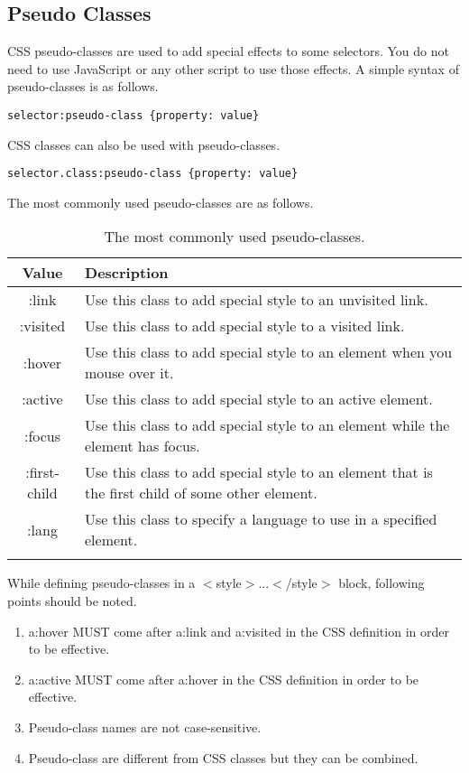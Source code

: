 \documentclass[a4paper,oneside]{book}
\numberwithin{equation}{chapter}
\begin{document}
\subsection{Pseudo Classes}
CSS pseudo-classes are used to add special effects to some selectors. You do not need to use JavaScript or any other script to use those effects. A simple syntax of pseudo-classes is as follows.
\begin{verbatim}
selector:pseudo-class {property: value}
\end{verbatim}
CSS classes can also be used with pseudo-classes.
\begin{verbatim}
selector.class:pseudo-class {property: value}
\end{verbatim}
The most commonly used pseudo-classes are as follows.
\begin{center}
\begin{longtable}{|c|p{10cm}|}
\hline
\textbf{Value} & \textbf{Description}\\
\hline
:link &	Use this class to add special style to an unvisited link.\\
\hline
:visited & Use this class to add special style to a visited link.\\
\hline
:hover & Use this class to add special style to an element when you mouse over it.\\
\hline
:active & Use this class to add special style to an active element.\\
\hline
:focus & Use this class to add special style to an element while the element has focus.\\
\hline
:first-child & Use this class to add special style to an element that is the first child of some other element.\\
\hline
:lang &	Use this class to specify a language to use in a specified element.\\
\hline
\caption{The most commonly used pseudo-classes.}
\end{longtable}
\end{center}
While defining pseudo-classes in a $<$style$>$...$<$/style$>$ block, following points should be noted.
\begin{enumerate}
\item a:hover MUST come after a:link and a:visited in the CSS definition in order to be effective.
\item a:active MUST come after a:hover in the CSS definition in order to be effective.
\item Pseudo-class names are not case-sensitive.
\item Pseudo-class are different from CSS classes but they can be combined.
\end{enumerate}
\end{document}
